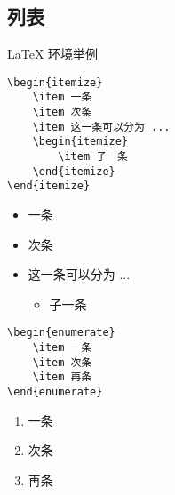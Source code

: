 \subsection{列表}
\begin{frame}[fragile]{\LaTeX{} 环境举例}
    \vspace{1em}
    \begin{minipage}{0.4\linewidth}
        \begin{lstlisting}[basicstyle=\ttfamily\small]
\begin{itemize}
    \item 一条
    \item 次条
    \item 这一条可以分为 ...
    \begin{itemize}
        \item 子一条
    \end{itemize}
\end{itemize}
         \end{lstlisting}
    \end{minipage}\hspace{1.5cm}
    \begin{minipage}{0.4\linewidth}
        \begin{itemize}
            \item 一条
            \item 次条
            \item 这一条可以分为 ...
            \begin{itemize}
                \item 子一条
            \end{itemize}
        \end{itemize}
    \end{minipage}

\begin{minipage}{0.4\linewidth}
\begin{lstlisting}
\begin{enumerate}
    \item 一条
    \item 次条
    \item 再条
\end{enumerate}\end{lstlisting}
    \end{minipage}\hspace{1.5cm}
    \begin{minipage}{0.4\linewidth}
    \vspace{-1cm}
\begin{enumerate}
    \item 一条
    \item 次条
    \item 再条
\end{enumerate}
    \end{minipage}
\end{frame}
    
